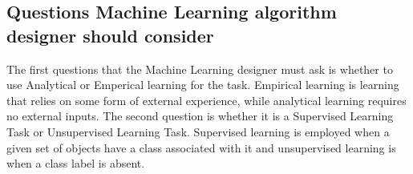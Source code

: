 \documentclass[10pt,onecolumn,letterpaper]{article}
\begin{document}
\subsection{Questions Machine Learning algorithm designer should consider}

The first questions that the Machine Learning designer must ask is whether to use Analytical or Emperical learning for the task. Empirical learning is learning that relies on some form of external experience, while analytical learning requires no external inputs. The second question is whether it is a Supervised Learning Task or Unsupervised Learning Task. Supervised learning is employed when a given set of objects have a class associated with it and unsupervised learning is when a class label is absent.


\end{document}
